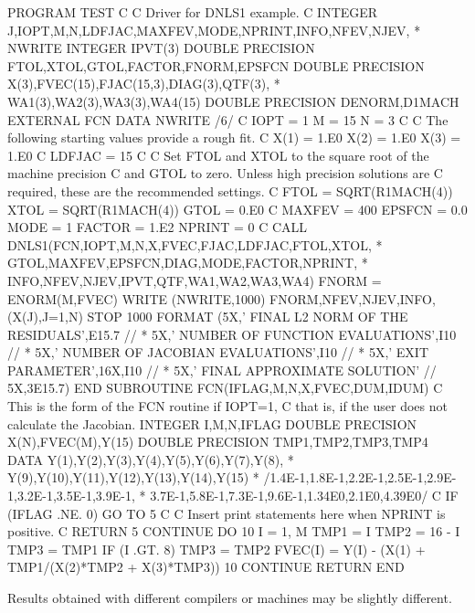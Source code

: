 \documentclass[11pt,twoside,nolof]{starlink}
\begin{document}
\begin{terminalv}
       PROGRAM TEST
 C
 C     Driver for DNLS1 example.
 C
       INTEGER J,IOPT,M,N,LDFJAC,MAXFEV,MODE,NPRINT,INFO,NFEV,NJEV,
      *        NWRITE
       INTEGER IPVT(3)
       DOUBLE PRECISION FTOL,XTOL,GTOL,FACTOR,FNORM,EPSFCN
       DOUBLE PRECISION X(3),FVEC(15),FJAC(15,3),DIAG(3),QTF(3),
      *     WA1(3),WA2(3),WA3(3),WA4(15)
       DOUBLE PRECISION DENORM,D1MACH
       EXTERNAL FCN
       DATA NWRITE /6/
 C
       IOPT = 1
       M = 15
       N = 3
 C
 C     The following starting values provide a rough fit.
 C
       X(1) = 1.E0
       X(2) = 1.E0
       X(3) = 1.E0
 C
       LDFJAC = 15
 C
 C     Set FTOL and XTOL to the square root of the machine precision
 C     and GTOL to zero.  Unless high precision solutions are
 C     required, these are the recommended settings.
 C
       FTOL = SQRT(R1MACH(4))
       XTOL = SQRT(R1MACH(4))
       GTOL = 0.E0
 C
       MAXFEV = 400
       EPSFCN = 0.0
       MODE = 1
       FACTOR = 1.E2
       NPRINT = 0
 C
       CALL DNLS1(FCN,IOPT,M,N,X,FVEC,FJAC,LDFJAC,FTOL,XTOL,
      *           GTOL,MAXFEV,EPSFCN,DIAG,MODE,FACTOR,NPRINT,
      *           INFO,NFEV,NJEV,IPVT,QTF,WA1,WA2,WA3,WA4)
       FNORM = ENORM(M,FVEC)
       WRITE (NWRITE,1000) FNORM,NFEV,NJEV,INFO,(X(J),J=1,N)
       STOP
  1000 FORMAT (5X,' FINAL L2 NORM OF THE RESIDUALS',E15.7 //
      *        5X,' NUMBER OF FUNCTION EVALUATIONS',I10 //
      *        5X,' NUMBER OF JACOBIAN EVALUATIONS',I10 //
      *        5X,' EXIT PARAMETER',16X,I10 //
      *        5X,' FINAL APPROXIMATE SOLUTION' // 5X,3E15.7)
       END
       SUBROUTINE FCN(IFLAG,M,N,X,FVEC,DUM,IDUM)
 C     This is the form of the FCN routine if IOPT=1,
 C     that is, if the user does not calculate the Jacobian.
       INTEGER I,M,N,IFLAG
       DOUBLE PRECISION X(N),FVEC(M),Y(15)
       DOUBLE PRECISION TMP1,TMP2,TMP3,TMP4
       DATA Y(1),Y(2),Y(3),Y(4),Y(5),Y(6),Y(7),Y(8),
      *     Y(9),Y(10),Y(11),Y(12),Y(13),Y(14),Y(15)
      *     /1.4E-1,1.8E-1,2.2E-1,2.5E-1,2.9E-1,3.2E-1,3.5E-1,3.9E-1,
      *      3.7E-1,5.8E-1,7.3E-1,9.6E-1,1.34E0,2.1E0,4.39E0/
 C
       IF (IFLAG .NE. 0) GO TO 5
 C
 C     Insert print statements here when NPRINT is positive.
 C
       RETURN
     5 CONTINUE
       DO 10 I = 1, M
          TMP1 = I
          TMP2 = 16 - I
          TMP3 = TMP1
          IF (I .GT. 8) TMP3 = TMP2
          FVEC(I) = Y(I) - (X(1) + TMP1/(X(2)*TMP2 + X(3)*TMP3))
    10    CONTINUE
       RETURN
       END


       Results obtained with different compilers or machines
       may be slightly different.


\end{terminalv}
\end{document}
